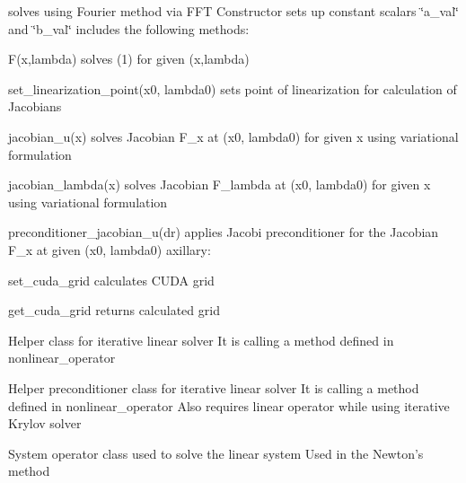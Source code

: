 solves using Fourier method via F\-F\-T Constructor sets up constant scalars \char`\"{}a\-\_\-val\char`\"{} and \char`\"{}b\-\_\-val\char`\"{} includes the following methods\-:
\begin{DoxyItemize}
\item F(x,lambda) solves (1) for given (x,lambda)
\item set\-\_\-linearization\-\_\-point(x0, lambda0) sets point of linearization for calculation of Jacobians
\item jacobian\-\_\-u(x) solves Jacobian F\-\_\-x at (x0, lambda0) for given x using variational formulation
\item jacobian\-\_\-lambda(x) solves Jacobian F\-\_\-lambda at (x0, lambda0) for given x using variational formulation
\item preconditioner\-\_\-jacobian\-\_\-u(dr) applies Jacobi preconditioner for the Jacobian F\-\_\-x at given (x0, lambda0) axillary\-:
\item set\-\_\-cuda\-\_\-grid calculates C\-U\-D\-A grid
\item get\-\_\-cuda\-\_\-grid returns calculated grid
\end{DoxyItemize}

Helper class for iterative linear solver It is calling a method defined in nonlinear\-\_\-operator

Helper preconditioner class for iterative linear solver It is calling a method defined in nonlinear\-\_\-operator Also requires linear operator while using iterative Krylov solver

System operator class used to solve the linear system Used in the Newton's method 